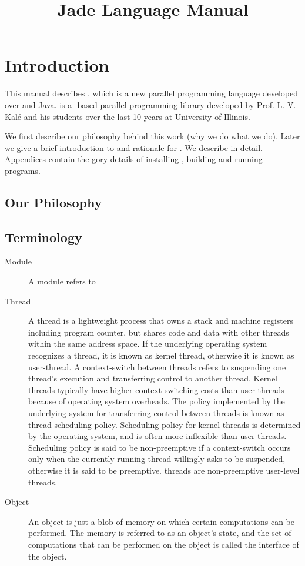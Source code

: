 \documentclass[10pt]{article}
\title{Jade Language Manual}
\begin{document}
\maketitle

\section{Introduction}

This manual describes \jade, which is a new parallel programming language
developed over \charmpp{} and Java. \charmpp{} is a
\CC{}-based parallel programming library developed by Prof. L. V. Kal\'{e} 
and his students over the last 10 years at University of Illinois.

We first describe our philosophy behind this work (why we do what we do).
Later we give a brief introduction to \charmpp{} and rationale for \jade. We
describe \jade in detail. Appendices contain the gory details of installing
\jade, building and running \jade programs.

\subsection{Our Philosophy}

\subsection{Terminology}

\begin{description}

\item[Module] A module refers to 

\item[Thread] A thread is a lightweight process that owns a stack and machine
registers including program counter, but shares code and data with other
threads within the same address space. If the underlying operating system
recognizes a thread, it is known as kernel thread, otherwise it is known as
user-thread. A context-switch between threads refers to suspending one thread's
execution and transferring control to another thread. Kernel threads typically
have higher context switching costs than user-threads because of operating
system overheads. The policy implemented by the underlying system for
transferring control between threads is known as thread scheduling policy.
Scheduling policy for kernel threads is determined by the operating system, and
is often more inflexible than user-threads. Scheduling policy is said to be
non-preemptive if a context-switch occurs only when the currently running
thread willingly asks to be suspended, otherwise it is said to be preemptive.
\jade threads are non-preemptive user-level threads.

\item[Object] An object is just a blob of memory on which certain computations
can be performed. The memory is referred to as an object's state, and the set
of computations that can be performed on the object is called the interface of
the object.

\end{description}
\end{document}
